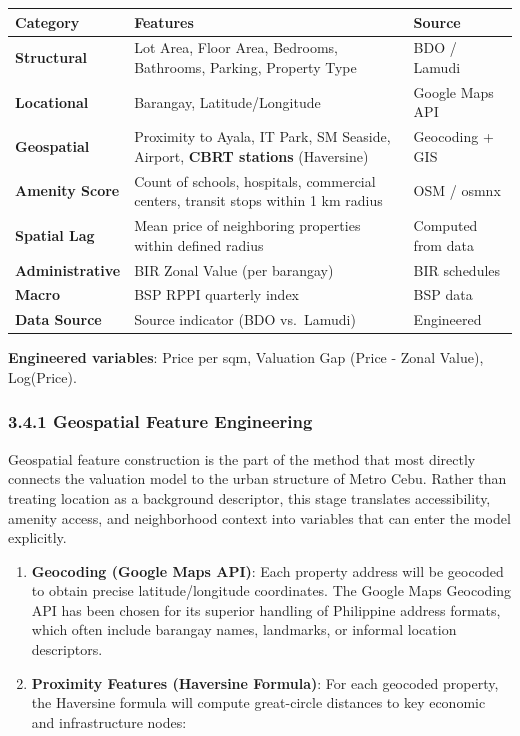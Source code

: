 \begin{center}
\begin{tabular}{p{} p{} p{}}
\toprule
Category & Features & Source \\
\midrule
\textbf{Structural} & Lot Area, Floor Area, Bedrooms, Bathrooms, Parking, Property Type & BDO / Lamudi \\
\textbf{Locational} & Barangay, Latitude/Longitude & Google Maps API \\
\textbf{Geospatial} & Proximity to Ayala, IT Park, SM Seaside, Airport, \textbf{CBRT stations} (Haversine) & Geocoding + GIS \\
\textbf{Amenity Score} & Count of schools, hospitals, commercial centers, transit stops within 1 km radius & OSM / osmnx \\
\textbf{Spatial Lag} & Mean price of neighboring properties within defined radius & Computed from data \\
\textbf{Administrative} & BIR Zonal Value (per barangay) & BIR schedules \\
\textbf{Macro} & BSP RPPI quarterly index & BSP data \\
\textbf{Data Source} & Source indicator (BDO vs.~Lamudi) & Engineered \\
\bottomrule
\end{tabular}
\end{center}

\textbf{Engineered variables}: Price per sqm, Valuation Gap (Price - Zonal Value), Log(Price).

\subsubsection{\texorpdfstring{\textbf{3.4.1 Geospatial Feature Engineering}}{3.4.1 Geospatial Feature Engineering}}\label{geospatial-feature-engineering}

Geospatial feature construction is the part of the method that most directly connects the valuation model to the urban structure of Metro Cebu. Rather than treating location as a background descriptor, this stage translates accessibility, amenity access, and neighborhood context into variables that can enter the model explicitly.

\begin{enumerate}
\item \textbf{Geocoding (Google Maps API)}: Each property address will be geocoded to obtain precise latitude/longitude coordinates. The Google Maps Geocoding API has been chosen for its superior handling of Philippine address formats, which often include barangay names, landmarks, or informal location descriptors.
\item \textbf{Proximity Features (Haversine Formula)}: For each geocoded property, the Haversine formula will compute great-circle distances to key economic and infrastructure nodes:
\end{enumerate}

